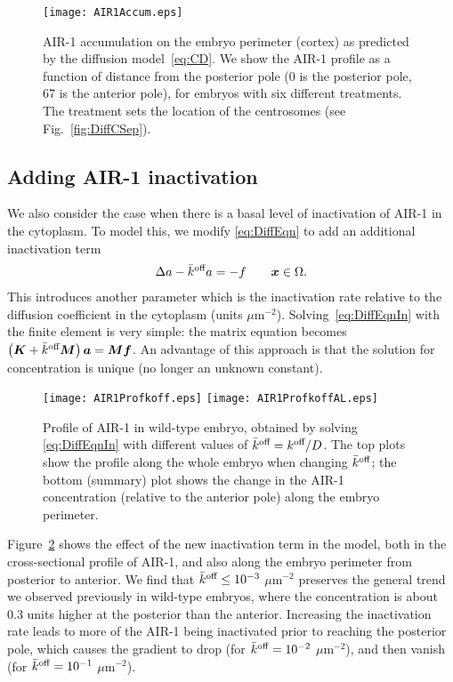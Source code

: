 \documentclass[11pt]{article}
\newcommand{\V}[1]{\boldsymbol{#1}}                 %
\newcommand{\M}[1]{\boldsymbol{#1}}
\begin{document}
\begin{figure}
\centering
\texttt{[image: AIR1Accum.eps]}
\caption{\label{fig:AIR1Acc}AIR-1 accumulation on the embryo perimeter (cortex) as predicted by the diffusion model\ \eqref{eq:CD}. We show the AIR-1 profile as a function of distance from the posterior pole (0 is the posterior pole, 67 is the anterior pole), for embryos with six different treatments. The treatment sets the location of the centrosomes (see Fig.\ \ref{fig:DiffCSep}).}
\end{figure}

\subsection{Adding AIR-1 inactivation \label{sec:inact}}
We also consider the case when there is a basal level of inactivation of AIR-1 in the cytoplasm. To model this, we modify \eqref{eq:DiffEqn} to add an additional inactivation term
\begin{gather}
\label{eq:DiffEqnIn}
\Delta a -\koffb a=  -f \qquad \V{x} \in \Omega.
\end{gather} 
This introduces another parameter which is the inactivation rate relative to the diffusion coefficient in the cytoplasm (units $\mu$m$^{-2}$). Solving\ \eqref{eq:DiffEqnIn} with the finite element is very simple: the matrix equation becomes $\left(\M K + \koffb \M M \right) \V a = \M M \V f$. An advantage of this approach is that the solution for concentration is unique (no longer an unknown constant).

\begin{figure}
\centering
\texttt{[image: AIR1Profkoff.eps]}
\texttt{[image: AIR1ProfkoffAL.eps]}
\caption{\label{fig:AIR1ProfKoff} Profile of AIR-1 in wild-type embryo, obtained by solving \eqref{eq:DiffEqnIn} with different values of $\bar{k}^\text{off}=k^\text{off}/D$. The top plots show the profile along the whole embryo when changing $\bar{k}^\text{off}$; the bottom (summary) plot shows the change in the AIR-1 concentration (relative to the anterior pole) along the embryo perimeter.}
\end{figure}

Figure\ \ref{fig:AIR1ProfKoff} shows the effect of the new inactivation term in the model, both in the cross-sectional profile of AIR-1, and also along the embryo perimeter from posterior to anterior. We find that $\bar{k}^\text{off} \leq 10^{-3}$ $\mu$m$^{-2}$ preserves the general trend we observed previously in wild-type embryos, where the concentration is about 0.3 units higher at the posterior than the anterior. Increasing the inactivation rate leads to more of the AIR-1 being inactivated prior to reaching the posterior pole, which causes the gradient to drop (for $\bar{k}^\text{off}=10^{-2}$ $\mu$m$^{-2}$), and then vanish (for $\bar{k}^\text{off}=10^{-1}$ $\mu$m$^{-2}$).
\end{document}
